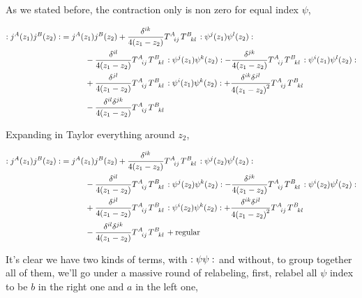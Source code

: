 As we stated before, the contraction only is non zero for equal index $\psi$,

\begin{align*}
    \cnord{j^A\qty(z_1)j^B\qty(z_2)}&=j^A\qty(z_1)j ^B\qty(z_2)+\frac{\delta^{ik}}{4\qty(z_1-z_2)}\tensor{T}{^A_{ij}}\tensor{T}{^B_{kl}}\cnord{\psi^j\qty(z_1)\psi^l\qty(z_2)}\\
    &\quad\quad\quad-\frac{\delta^{il}}{4\qty(z_1-z_2)}\tensor{T}{^A_{ij}}\tensor{T}{^B_{kl}}\cnord{\psi^j\qty(z_1)\psi^k\qty(z_2)}-\frac{\delta^{jk}}{4\qty(z_1-z_2)}\tensor{T}{^A_{ij}}\tensor{T}{^B_{kl}}\cnord{\psi^i\qty(z_1)\psi^l\qty(z_2)}\\
    &\quad\quad\quad+\frac{\delta^{jl}}{4\qty(z_1-z_2)}\tensor{T}{^A_{ij}}\tensor{T}{^B_{kl}}\cnord{\psi^i\qty(z_1)\psi^k\qty(z_2)}+\frac{\delta^{ik}\delta^{jl}}{4\qty(z_1-z_2)^2}\tensor{T}{^A_{ij}}\tensor{T}{^B_{kl}}\\
    &\quad\quad\quad-\frac{\delta^{il}\delta^{jk}}{4\qty(z_1-z_2)}\tensor{T}{^A_{ij}}\tensor{T}{^B_{kl}}
\end{align*}

Expanding in Taylor everything around $z_2$,

\begin{align*}
    \cnord{j^A\qty(z_1)j^B\qty(z_2)}&=j^A\qty(z_1)j ^B\qty(z_2)+\frac{\delta^{ik}}{4\qty(z_1-z_2)}\tensor{T}{^A_{ij}}\tensor{T}{^B_{kl}}\cnord{\psi^j\qty(z_2)\psi^l\qty(z_2)}\\
    &\quad\quad\quad-\frac{\delta^{il}}{4\qty(z_1-z_2)}\tensor{T}{^A_{ij}}\tensor{T}{^B_{kl}}\cnord{\psi^j\qty(z_2)\psi^k\qty(z_2)}-\frac{\delta^{jk}}{4\qty(z_1-z_2)}\tensor{T}{^A_{ij}}\tensor{T}{^B_{kl}}\cnord{\psi^i\qty(z_2)\psi^l\qty(z_2)}\\
    &\quad\quad\quad+\frac{\delta^{jl}}{4\qty(z_1-z_2)}\tensor{T}{^A_{ij}}\tensor{T}{^B_{kl}}\cnord{\psi^i\qty(z_2)\psi^k\qty(z_2)}+\frac{\delta^{ik}\delta^{jl}}{4\qty(z_1-z_2)^2}\tensor{T}{^A_{ij}}\tensor{T}{^B_{kl}}\\
    &\quad\quad\quad-\frac{\delta^{il}\delta^{jk}}{4\qty(z_1-z_2)}\tensor{T}{^A_{ij}}\tensor{T}{^B_{kl}}+\textnormal{regular}
\end{align*}

It's clear we have two kinds of terms, with $:\psi\psi:$ and without, to group together all of them, we'll go under a massive round of relabeling, 
first, relabel all $\psi$ index to be $b$ in the right one and $a$ in the left one,

